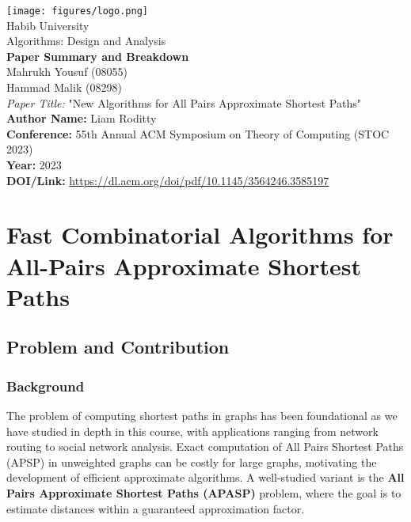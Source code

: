 \documentclass[a4paper,11pt,oneside]{book}
\begin{document}
\begin{titlepage}      
    \begin{center}
        \texttt{[image: figures/logo.png]}\\[1.0cm]
        {\LARGE Habib University\\[0.5cm]
        Algorithms: Design and Analysis}\\[1cm]
        
        \linespread{0.1}\huge {
            \textbf{Paper Summary and Breakdown} 
        }
        \linespread{1}~\\[2cm]

        {\Large 
            Mahrukh Yousuf (08055) \\ 
            Hammad Malik (08298)
        }\\[1cm] 
        
        {\large 
            \emph{Paper Title:} "New Algorithms for All Pairs Approximate Shortest Paths"}\\[1cm] 
            
        \large \textbf{Author Name:} Liam Roditty \\ 
        \textbf{Conference:} 55th Annual ACM Symposium on Theory of Computing (STOC 2023)\\
        \textbf{Year:} 2023\\
        \textbf{DOI/Link:} \url{https://dl.acm.org/doi/pdf/10.1145/3564246.3585197}
    \end{center}
\end{titlepage}

\chapter*{Fast Combinatorial Algorithms for All-Pairs Approximate Shortest Paths}

\section*{Problem and Contribution}

\subsection*{Background}
The problem of computing shortest paths in graphs has been foundational as we have studied in depth in this course, with applications ranging from network routing to social network analysis. Exact computation of All Pairs Shortest Paths (APSP) in unweighted graphs can be costly for large graphs, motivating the development of efficient approximate algorithms. A well-studied variant is the \textbf{All Pairs Approximate Shortest Paths (APASP)} problem, where the goal is to estimate distances within a guaranteed approximation factor.
\end{document}
